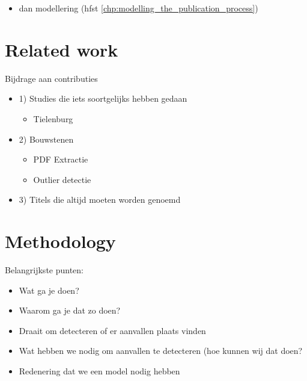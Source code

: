 \documentclass{ou-report}
\newcommand{\outline}[1]{{\color{blue} #1}}
\begin{document}
\outline{
\begin{itemize}
    \item dan modellering (hfst \ref{chp:modelling_the_publication_process})
\end{itemize}
}

\chapter{Related work}
\outline{
Bijdrage aan contributies
\begin{itemize}
    \item 1) Studies die iets soortgelijks hebben gedaan
    \begin{itemize}
        \item Tielenburg
    \end{itemize}
    \item 2) Bouwstenen
    \begin{itemize}
        \item PDF Extractie
        \item Outlier detectie
    \end{itemize}
    \item 3) Titels die altijd moeten worden genoemd
\end{itemize}
}


\chapter{Methodology}
Belangrijkste punten:
\outline{
\begin{itemize}
    \item Wat ga je doen?
    \item Waarom ga je dat zo doen?
\end{itemize}
\begin{itemize}
    \item Draait om detecteren of er aanvallen plaats vinden
    \item Wat hebben we nodig om aanvallen te detecteren (hoe kunnen wij dat 
    doen?
    \item Redenering dat we een model nodig hebben
\end{itemize}
}
\end{document}
